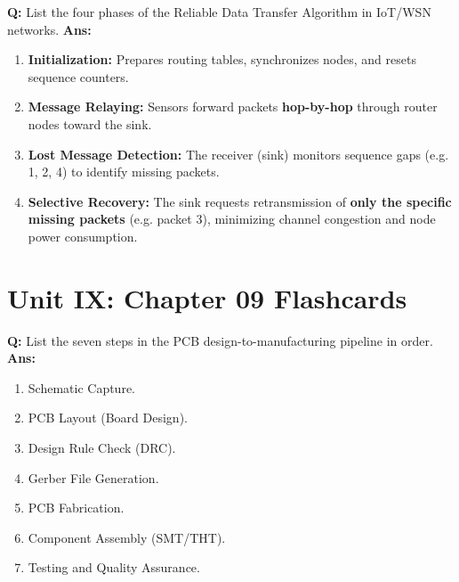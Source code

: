\documentclass[10pt,a4paper,twocolumn]{article}
\begin{document}
\begin{tcolorbox}[
  colback=white,
  colframe=UnitColorEight,
  colbacktitle=gray!10!white,
  coltitle=black,
  fonttitle=\bfseries\sffamily\small,
  title={Unit VIII $\bullet$ Card 11},
  boxrule=1.2pt,
  arc=2mm,
  outer arc=2mm,
  boxsep=1.5mm,
  top=1mm,
  bottom=1mm,
  left=1.5mm,
  right=1.5mm,
  before skip=2.5mm,
  after skip=2.5mm
]
\textbf{Q:} List the four phases of the Reliable Data Transfer Algorithm in IoT/WSN networks.
\tcbline
\textbf{Ans:} \begin{enumerate}
  \item \textbf{Initialization:} Prepares routing tables, synchronizes nodes, and resets sequence counters.
  \item \textbf{Message Relaying:} Sensors forward packets \textbf{hop-by-hop} through router nodes toward the sink.
  \item \textbf{Lost Message Detection:} The receiver (sink) monitors sequence gaps (e.g. 1, 2, 4) to identify missing packets.
  \item \textbf{Selective Recovery:} The sink requests retransmission of \textbf{only the specific missing packets} (e.g. packet 3), minimizing channel congestion and node power consumption.
\end{enumerate}
\end{tcolorbox}

\section*{Unit IX: Chapter 09 Flashcards}

\begin{tcolorbox}[
  colback=white,
  colframe=UnitColorNine,
  colbacktitle=gray!10!white,
  coltitle=black,
  fonttitle=\bfseries\sffamily\small,
  title={Unit IX $\bullet$ Card 1},
  boxrule=1.2pt,
  arc=2mm,
  outer arc=2mm,
  boxsep=1.5mm,
  top=1mm,
  bottom=1mm,
  left=1.5mm,
  right=1.5mm,
  before skip=2.5mm,
  after skip=2.5mm
]
\textbf{Q:} List the seven steps in the PCB design-to-manufacturing pipeline in order.
\tcbline
\textbf{Ans:} \begin{enumerate}
  \item Schematic Capture.
  \item PCB Layout (Board Design).
  \item Design Rule Check (DRC).
  \item Gerber File Generation.
  \item PCB Fabrication.
  \item Component Assembly (SMT/THT).
  \item Testing and Quality Assurance.
\end{enumerate}
\end{tcolorbox}
\end{document}
